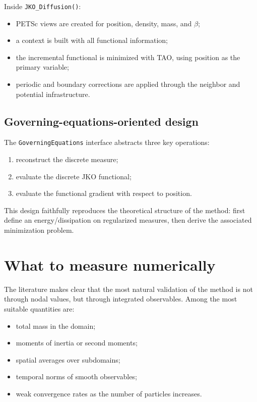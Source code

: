 \documentclass[11pt,a4paper]{article}
\begin{document}
Inside \texttt{JKO\_Diffusion()}:
\begin{itemize}[leftmargin=*]
  \item PETSc views are created for position, density, mass, and $\beta$;
  \item a context is built with all functional information;
  \item the incremental functional is minimized with TAO, using position as the primary variable;
  \item periodic and boundary corrections are applied through the neighbor and potential infrastructure.
\end{itemize}

\subsection{Governing-equations-oriented design}
The \texttt{GoverningEquations} interface abstracts three key operations:
\begin{enumerate}[label=\arabic*.]
  \item reconstruct the discrete measure;
  \item evaluate the discrete JKO functional;
  \item evaluate the functional gradient with respect to position.
\end{enumerate}

This design faithfully reproduces the theoretical structure of the method: first define an energy/dissipation on regularized measures, then derive the associated minimization problem.

\section{What to measure numerically}
The literature makes clear that the most natural validation of the method is not through nodal values, but through integrated observables. Among the most suitable quantities are:
\begin{itemize}[leftmargin=*]
  \item total mass in the domain;
  \item moments of inertia or second moments;
  \item spatial averages over subdomains;
  \item temporal norms of smooth observables;
  \item weak convergence rates as the number of particles increases.
\end{itemize}
\end{document}
